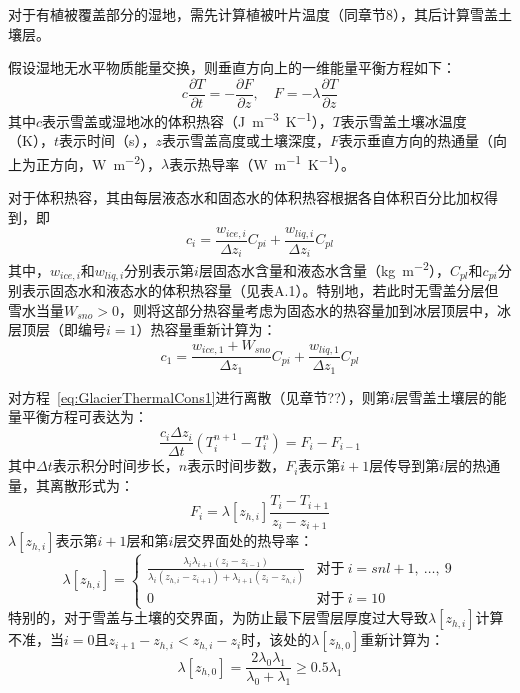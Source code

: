 对于有植被覆盖部分的湿地，需先计算植被叶片温度（同章节8），其后计算雪盖土壤层。

假设湿地无水平物质能量交换，则垂直方向上的一维能量平衡方程如下：
\begin{equation}\label{eq:GlacierThermalCons1}
    c \frac{\partial T}{\partial t}=-\frac{\partial F}{\partial z},  \quad F=-\lambda \frac{\partial T}{\partial z}
\end{equation}
其中$c$表示雪盖或湿地冰的体积热容（\unit{J.m^{-3}.K^{-1}}），$T$表示雪盖土壤冰温度（K），$t$表示时间（s），$z$表示雪盖高度或土壤深度，$F$表示垂直方向的热通量（向上为正方向，\unit{W.m^{-2}}），$\lambda$表示热导率（\unit{W.m^{-1}.K^{-1}}）。

对于体积热容，其由每层液态水和固态水的体积热容根据各自体积百分比加权得到，即
\begin{equation}
    c_i = \frac{w_{ice,i}}{\Delta z_i}C_{pi} + \frac{w_{liq,i}}{\Delta z_i}C_{pl}
\end{equation}
其中，$w_{ice,i}$和$w_{liq,i}$分别表示第$i$层固态水含量和液态水含量（\unit{kg.m^{-2}}），$C_{pl}$和$c_{pi}$分别表示固态水和液态水的体积热容量（见表A.1）。特别地，若此时无雪盖分层但雪水当量$W_{sno}>0$，则将这部分热容量考虑为固态水的热容量加到冰层顶层中，冰层顶层（即编号$i=1$）热容量重新计算为：
\begin{equation}
    c_1 = \frac{w_{ice,1}+W_{sno}}{\Delta z_1}C_{pi} + \frac{w_{liq,1}}{\Delta z_1}C_{pl}
\end{equation}

对方程~\eqref{eq:GlacierThermalCons1}进行离散（见章节??），则第$i$层雪盖土壤层的能量平衡方程可表达为：
\begin{equation}\label{eq:GlacierThermal1}
    \frac{c_i \Delta z_i}{\Delta t} \left(T^{n+1}_i - T^n_i\right) = F_i - F_{i-1}
\end{equation}
其中$\Delta t$表示积分时间步长，$n$表示时间步数，$F_i$表示第$i+1$层传导到第$i$层的热通量，其离散形式为：
\begin{equation}
    F_i = \lambda \left[z_{h,i}\right] \frac{T_i-T_{i+1}}{z_i-z_{i+1}}
\end{equation}
$\lambda\left[z_{h,i}\right]$表示第$i+1$层和第$i$层交界面处的热导率：
\begin{equation}
    \lambda \left[z_{h,i}\right] = \begin{cases}
        \frac{\lambda_i\lambda_{i+1}\left(z_i-z_{i-1}\right)}{\lambda_i\left(z_{h,i}-z_{i+1}\right)+\lambda_{i+1}\left(z_i-z_{h,i}\right)}  &\text{对于}\ i=snl+1,\ \ldots,\ 9 \\
        0 &\text{对于}\ i=10
    \end{cases}
\end{equation}
特别的，对于雪盖与土壤的交界面，为防止最下层雪层厚度过大导致$\lambda\left[z_{h,i}\right]$计算不准，当$i=0$且$z_{i+1}-z_{h,i}<z_{h,i}-z_i$时，该处的$\lambda\left[z_{h,0}\right]$重新计算为：
\begin{equation}
    \lambda\left[z_{h,0}\right]=\frac{2\lambda_0\lambda_1}{\lambda_0+\lambda_1} \geqslant 0.5\lambda_1
\end{equation}

